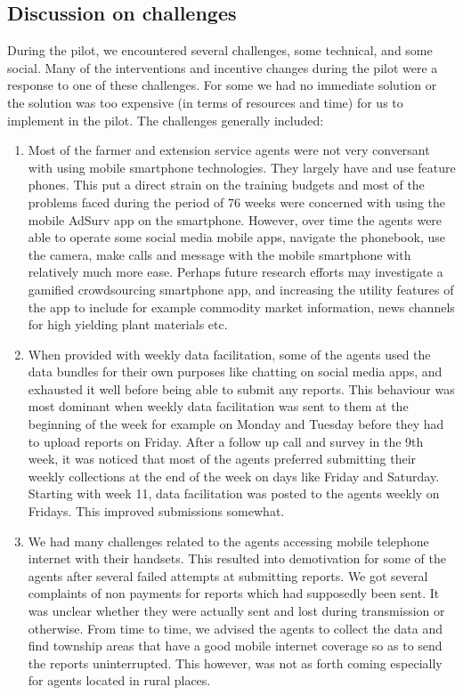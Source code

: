 \documentclass[letterpaper]{article} %
\begin{document}
\subsection{Discussion on challenges}

During the pilot, we encountered several challenges, some technical, and some social. Many of the interventions and incentive changes during the pilot were a response to one of these challenges. For some we had no immediate solution or the solution was too expensive (in terms of resources and time) for us to implement in the pilot. The challenges generally included:
\begin{enumerate}
\item Most of the farmer and extension service agents were not very conversant with using mobile smartphone technologies. They largely have and use  feature phones. This put a direct strain on the training budgets and most of the problems faced during the period of 76 weeks were concerned with using the mobile AdSurv app on the smartphone. However, over time the agents were able to operate some social media mobile apps, navigate the phonebook, use the camera, make calls and message with the mobile smartphone with relatively much more ease. Perhaps future research efforts may investigate a gamified crowdsourcing smartphone app, and increasing the utility features of the app to include for example commodity market information, news channels for high yielding plant materials etc.
\item When provided with weekly data facilitation, some of the agents used the data bundles for their own purposes like chatting on social media apps, and exhausted it well before being able to submit any reports. This behaviour was most dominant when weekly data facilitation was sent to them at the beginning of the week for example on Monday and Tuesday before they had to upload reports on Friday. After a follow up call and survey in the 9th week, it was noticed that most of the agents preferred submitting their weekly collections at the end of the week on days like Friday and Saturday. Starting with week 11, data facilitation was posted to the agents weekly on Fridays. This improved submissions somewhat.
\item We had many challenges related to the agents accessing mobile telephone internet with their handsets. This resulted into demotivation for some of the agents after several failed attempts at submitting reports. We got several complaints of non payments for reports which had supposedly been sent. It was unclear whether they were actually sent and lost during transmission or otherwise. From time to time, we advised the agents to collect the data and find township areas that have a good mobile internet coverage so as to send the reports uninterrupted. This however, was not as forth coming especially for agents located in rural places.

\end{enumerate}
\end{document}
